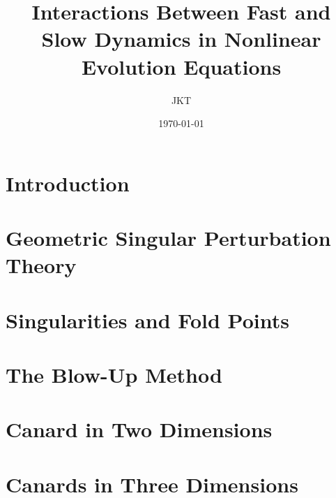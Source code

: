 \documentclass{article}
\title{Interactions Between Fast and Slow Dynamics in Nonlinear Evolution Equations}
\author{JKT}
\date{\today}
\begin{document}
\maketitle
\newpage
{} %
\tableofcontents
\listoffigures

\newpage
{} %
\pagestyle{fancy}

\begin{abstract}
	
\end{abstract}


\section{Introduction}\label{Intro}


\section{Geometric Singular Perturbation Theory} \label{GSPT}


\section{Singularities and Fold Points}\label{sec:singularitiesandfoldpoints}



%


\section{The Blow-Up Method}\label{sec: VDP Blowup}


\section{Canard in Two Dimensions}\label{sec:canard-points}



\section{Canards in Three Dimensions} \label{sec: threedimfolds}

\end{document}
